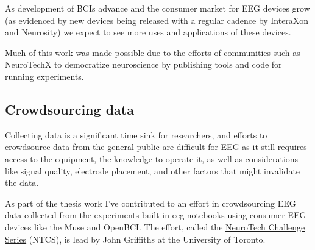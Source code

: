     As development of BCIs advance and the consumer market for EEG devices grow (as evidenced by new devices being released with a regular cadence by InteraXon and Neurosity) we expect to see more uses and applications of these devices.

    Much of this work was made possible due to the efforts of communities such as NeuroTechX to democratize neuroscience by publishing tools and code for running experiments.

\subsection{Crowdsourcing data}

    Collecting data is a significant time sink for researchers, and efforts to crowdsource data from the general public are difficult for EEG as it still requires access to the equipment, the knowledge to operate it, as well as considerations like signal quality, electrode placement, and other factors that might invalidate the data.

    As part of the thesis work I've contributed to an effort in crowdsourcing EEG data collected from the experiments built in eeg-notebooks using consumer EEG devices like the Muse and OpenBCI\@. The effort, called the \href{https://neurotech-challenge.com/}{NeuroTech Challenge Series} (NTCS), is lead by John Griffiths at the University of Toronto.


